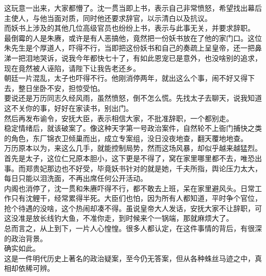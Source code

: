 \begin{multicols}{\theparacolNo}
这玩意一出来，大家都懵了。沈一贯当即上书，表示自己非常愤怒，希望找出幕后主使人，与他当面对质，同时他还要求辞官，以示清白以及抗议。\\

而妖书上涉及的其他几位高级官员也纷纷上书，表示与此事无关，并要求辞职。\\

最倒霉的人是朱赓，或许是有人恶搞他，竟然把一份妖书放在了他的家门口。这位朱先生是个厚道人，吓得不行，当即把这份妖书和自己的奏疏上呈皇帝，还一把鼻涕一把泪地哭诉，说我今年都快七十了，有如此恩宠已是意外，也没啥别的追求，现在竟然被人诬陷，请陛下让我告老还乡。\\

朝廷一片混乱，太子也吓得不行。他刚消停两年，就出这么个事，闹不好又得下去，整日坐卧不安，担惊受怕。\\

要说还是万历同志久经风雨，虽然愤怒，倒不怎么慌。先找太子去聊天，说我知道这不关你的事，好好在家读书，别出门。\\

然后再发布谕令，安抚大臣，表示相信大家，不批准辞职，一个都别走。\\

稳定情绪后，就该破案了。像这种天字第一号政治案件，自然轮不上衙门捕快之类的角色，东厂锦衣卫倾巢而出，成立专案组，没日没夜地查，翻天覆地地查。\\

万历原本以为，来这么几手，就能控制局势，然而这场风暴，却似乎越来越猛烈。\\

首先是太子，这位仁兄原本胆小，这下更是不得了，窝在家里哪里都不去，唯恐出事。而郑贵妃那边也不好受，毕竟妖书针对的就是她，千夫所指，舆论压力太大，每日只能以泪洗面，不再出席任何公开活动。\\

内阁也消停了，沈一贯和朱赓吓得不行，都不敢去上班，呆在家里避风头。日常工作只有沈鲤干，经常累得半死。大臣们也怕，因为所有人都知道，平时争个官位，抢个待遇的没啥，这个热闹却凑不得。虽说皇帝大人发话，安抚大家不让辞职，可这没准是放长线钓大鱼，不准你走，到时候来个一锅端，那就麻烦大了。\\

总而言之，从上到下，一片人心惶惶。很多人都认定，在这件事情的背后，有很深的政治背景。\\

确实如此。\\

这是一件明代历史上著名的政治疑案，至今仍无答案，但从各种蛛丝马迹之中，真相却依稀可辨。\\


\end{multicols}
